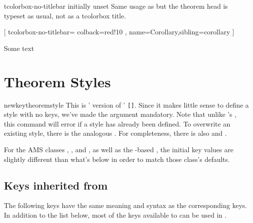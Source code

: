 \documentclass{ltxdoc}
\newcommand{\bracks}[1]{\texttt{[#1]}}
\begin{document}
\begin{docKey}{tcolorbox-no-titlebar}
  {}
  {initially unset}
Same usage as  but the theorem head is typeset as usual, not as a tcolorbox title.

\begin{tcbwritetemp}
[
  tcolorbox-no-titlebar={
    colback=red!10
    },
  name=Corollary,sibling=corollary
  ]
\end{tcbwritetemp}

\begin{keythmscode}[withpreamble]
\begin{boxcor}
Some text
\end{boxcor}
\end{keythmscode}

\end{docKey}

\section{Theorem Styles}

\begin{docCommand}{newkeytheoremstyle}
  {}
This is ' version of ' \bracks{}. Since it makes little sense to define a style with no keys, we've made the  argument mandatory. Note that unlike 's , this command will error if a style has already been defined. To overwrite an existing style, there is the analogous . For completeness, there is also  and .
\end{docCommand}

\begin{notebox}
For the AMS classes , , and , as well as the -based , the initial key values are slightly different than what's below in order to match those class's defaults.
\end{notebox}

\subsection{Keys inherited from }

The following keys have the same meaning and syntax as the corresponding  keys. In addition to the list below, most of the keys available to  can be used in .
\end{document}
